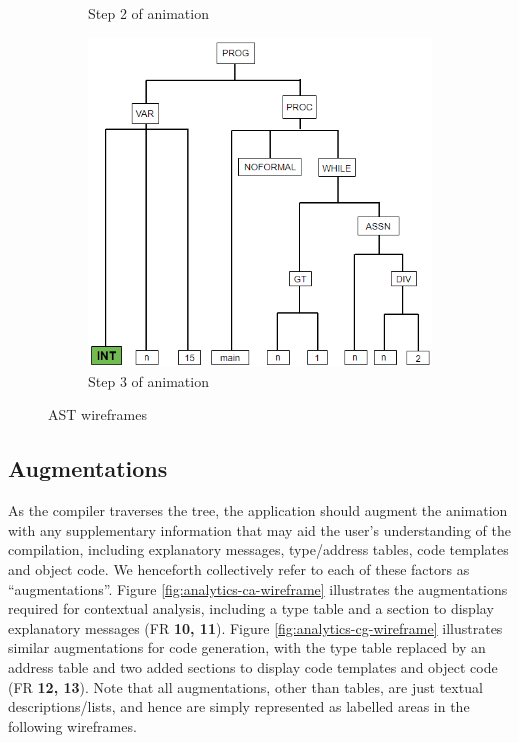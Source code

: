 \documentclass{l4proj}
\begin{document}
\begin{figure}[h]
\begin{subfigure}[b]{.33\textwidth}
		\caption{Step 2 of animation}
		\label{fig:anim-step-2}
	\end{subfigure}%
	\begin{subfigure}[b]{.33\textwidth}
		\centering
		\includegraphics[width=\linewidth]{images/animation-active-wireframe3.png}
		\caption{Step 3 of animation}
		\label{fig:anim-step-3}
	\end{subfigure}	
	\caption{AST wireframes}
	\label{fig:animation-active-wireframe}	
\end{figure}

\subsection{Augmentations}
As the compiler traverses the tree, the application should augment the animation with any supplementary information that may aid the user's understanding of the compilation, including explanatory messages, type/address tables, code templates and object code. We henceforth collectively refer to each of these factors as ``augmentations''. Figure \ref{fig:analytics-ca-wireframe} illustrates the augmentations required for contextual analysis, including a type table and a section to display explanatory messages (FR \textbf{10, 11}). Figure \ref{fig:analytics-cg-wireframe} illustrates similar augmentations for code generation, with the type table replaced by an address table and two added sections to display code templates and object code (FR \textbf{12, 13}). Note that all augmentations, other than tables, are just textual descriptions/lists, and hence are simply represented as labelled areas in the following wireframes.
\end{document}
